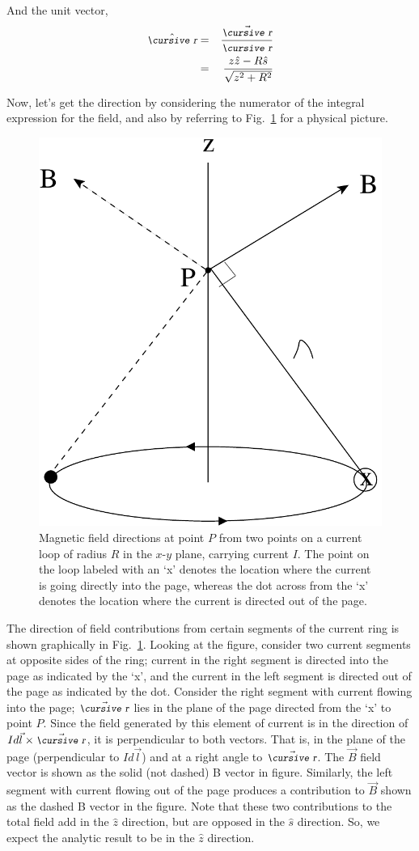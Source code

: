 \documentclass[12pt]{article}
\begin{document}
\begin{flushleft}
And the unit vector,
\begin{eqnarray*}
\hat{\text{\small\slshape\cursive r}} & =& \frac{\vec{\text{\small\slshape\cursive r}}}{\text{\small\slshape\cursive r}} \\
& = & \frac{z\hat{z}-R\hat{s}}{\sqrt{ z^{2}+R^{2}}}
\end{eqnarray*}

Now, let's get the direction by considering the numerator of the integral expression for the field, and also by referring to Fig.~\ref{fig:ringB} for a physical picture.

\begin{figure}[h]
\centering 
\includegraphics*[width=.35\columnwidth]{ringB.pdf} 
\caption{Magnetic field directions at point $P$ from two points on a current loop of radius $R$ in the $x$-$y$ plane, carrying current $I$.  The point on the loop labeled with an `x' denotes the location where the current is going directly into the page, whereas the dot across from the `x' denotes the location where the current is directed out of the page.}
\label{fig:ringB}
\end{figure}

The direction of field contributions from certain segments of the current ring is shown graphically in Fig.~\ref{fig:ringB}.  Looking at the figure, consider two current segments at opposite sides of the ring; current in the right segment is directed into the page as indicated by the `x', and the current in the left segment is directed out of the page as indicated by the dot.  Consider the right segment with current flowing into the page; $\vec{\text{\small\slshape\cursive r}}$ lies in the plane of the page directed from the `x' to point $P$.  Since the field generated by this element of current is in the direction of $Id\vec{l} \times \vec{\text{\small\slshape\cursive r}}$, it is perpendicular to both vectors.  That is, in the plane of the page (perpendicular to $Id\vec{l}$) and at a right angle to $\vec{\text{\small\slshape\cursive r}}$.  The $\vec{B}$ field vector is shown as the solid (not dashed) B vector in figure.  Similarly, the left segment with current flowing out of the page produces a contribution to $\vec{B}$ shown as the dashed B vector in the figure.  Note that these two contributions to the total field add in the $\hat{z}$ direction, but are opposed in the $\hat{s}$ direction.  So, we expect the analytic result to be in the $\hat{z}$ direction.


\end{flushleft}
\end{document}
